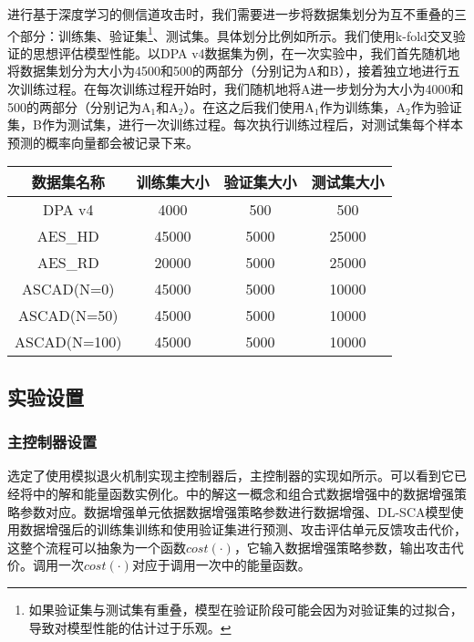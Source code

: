 {	进行基于深度学习的侧信道攻击时，我们需要进一步将数据集划分为互不重叠的三个部分：训练集、验证集\footnote{如果验证集与测试集有重叠，模型在验证阶段可能会因为对验证集的过拟合，导致对模型性能的估计过于乐观。}、测试集。具体划分比例如所示。我们使用k-fold交叉验证的思想评估模型性能。以DPA v4数据集为例，在一次实验中，我们首先随机地将数据集划分为大小为4500和500的两部分（分别记为A和B），接着独立地进行五次训练过程。在每次训练过程开始时，我们随机地将A进一步划分为大小为4000和500的两部分（分别记为A$_1$和A$_2$）。在这之后我们使用A$_1$作为训练集，A$_2$作为验证集，B作为测试集，进行一次训练过程。每次执行训练过程后，对测试集每个样本预测的概率向量都会被记录下来。%
	\begin{table}[!h]
		\label{tab:partition}
		\centering
		\begin{tabular}{c|ccc}
			\hline
			数据集名称&训练集大小&验证集大小&测试集大小\\
			\hline
			DPA v4    &4000 &500 &500\\
			AES\_HD   &45000&5000&25000\\
			AES\_RD   &20000&5000&25000\\
			ASCAD(N=0)&45000&5000&10000\\
			ASCAD(N=50)&45000&5000&10000\\
			ASCAD(N=100)&45000&5000&10000\\
			\hline
		\end{tabular}
	\end{table}
	\subsection{实验设置}
	\subsubsection{主控制器设置}\label{subss:controllersettings}
	选定了使用模拟退火机制实现主控制器后，主控制器的实现如所示。可以看到它已经将中的解和能量函数实例化。中的解这一概念和组合式数据增强中的数据增强策略参数对应。数据增强单元依据数据增强策略参数进行数据增强、DL-SCA模型使用数据增强后的训练集训练和使用验证集进行预测、攻击评估单元反馈攻击代价，这整个流程可以抽象为一个函数$cost(\cdot)$，它输入数据增强策略参数，输出攻击代价。调用一次$cost(\cdot)$对应于调用一次中的能量函数。
	
}
